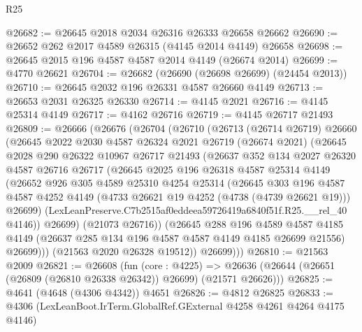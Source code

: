 \begin{lexlean}{R25}
\begin{coremodule}
@26682 := @26645 @2018 @2034 @26316 @26333 @26658 @26662
@26690 := @26652 @262 @2017 @4589 @26315 (@4145 @2014 @4149) @26658
@26698 := @26645 @2015 @196 @4587 @4587 @2014 @4149 (@26674 @2014)
@26699 := @4770 @26621
@26704 := @26682 (@26690 (@26698 @26699) (@24454 @2013))
@26710 := @26645 @2032 @196 @26331 @4587 @26660 @4149
@26713 := @26653 @2031 @26325 @26330
@26714 := @4145 @2021
@26716 := @4145 @25314 @4149
@26717 := @4162 @26716
@26719 := @4145 @26717 @21493
@26809 := @26666
    (@26676
      (@26704
        (@26710
          (@26713
            (@26714 @26719)
            @26660
            (@26645
              @2022
              @2030
              @4587
              @26324
              @2021
              @26719
              (@26674 @2021)
              (@26645
                @2028
                @290
                @26322
                @10967
                @26717
                @21493
                (@26637
                  @352
                  @134
                  @2027
                  @26320
                  @4587
                  @26716
                  @26717
                  (@26645
                    @2025
                    @196
                    @26318
                    @4587
                    @25314
                    @4149
                    (@26652
                      @926
                      @305
                      @4589
                      @25310
                      @4254
                      @25314
                      (@26645
                        @303
                        @196
                        @4587
                        @4587
                        @4252
                        @4149
                        (@4733 @26621 @19 @4252 (@4738 (@4739 @26621 @19)))
                        @26699)
                      (LexLeanPreserve.C7b2515af0eddeea59726419a6840f51f.R25.__rel_40 @4146))
                    @26699)
                  (@21073 @26716))
                (@26645
                  @288
                  @196
                  @4589
                  @4587
                  @4185
                  @4149
                  (@26637 @285 @134 @196 @4587 @4587 @4149 @4185 @26699 @21556)
                  @26699)))
            (@21563 @2020 @26328 @19512))
          @26699)))
@26810 := @21563 @2009
@26821 := @26608
    (fun (core : @4225) =>
    @26636 (@26644 (@26651 (@26809 (@26810 @26338 @26342)) @26699) (@21571 @26626)))
@26825 := @4641 (@4648 (@4306 @4342)) @4651
@26826 := @4812 @26825
@26833 := @4306 (LexLeanBoot.IrTerm.GlobalRef.GExternal @4258 @4261 @4264 @4175 @4146)

\end{coremodule}
\end{lexlean}
